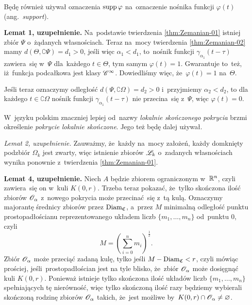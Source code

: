 \documentclass[a4paper,11pt]{article}
\numberwithin{equation}{section}
\begin{document}
Będę również używał oznaczenia $\operatorname{supp} \varphi$ na~oznaczenie nośnika
funkcji $\varphi( t )$ (ang.~\textit{support}).

\VerSpaceFour





\noindent
{} \textbf{Lemat 1, uzupełnienie.} Na~podstawie twierdzenia
\eqref{thm:Zemanian-01} istniej zbiór $\Psi$ o~żądanych własnościach. Teraz
na~mocy twierdzenia \eqref{thm:Zemanian-02} mamy
$d( \Theta, \complement \Psi ) = d_{ 1 } > 0$, jeśli więc $\alpha_{ 1 } < d_{ 1 }$, to~nośnik funkcji
$\gamma_{ \alpha_{ 1 } }( t - \tau )$ zawiera~się w~$\Psi$ dla~każdego $t \in \Theta$, tym samym
$\varphi( t ) = 1$. Gwarantuje to~też, iż~funkcja podcałkowa jest klasy
$\mathcal{C}^{ \infty }$. Dowiedliśmy więc, że~$\varphi( t ) = 1$ na~$\Theta$.

Jeśli teraz oznaczymy odległość $d( \Psi, \complement \Omega ) = d_{ 2 } > 0$ i~przyjmiemy
$\alpha_{ 2 } < d_{ 2 }$, to dla każdego $t \in \complement \Omega$ nośnik funkcji
$\gamma_{ \alpha_{ 1 } }( t - \tau )$ nie przecina~się z~$\Psi$, więc $\varphi( t ) = 0$.

\VerSpaceFour





\noindent
{} W~języku polskim znaczniej lepiej od~nazwy
\textit{lokalnie skończonego pokrycia} brzmi określenie \textit{pokrycie
  lokalnie skończone}. Jego też będę dalej używał.

\VerSpaceFour





\noindent
{} \textit{Lemat 2, uzupełnienie.} Zauważmy, że~każdy na~mocy
założeń, każdy domknięty podzbiór $\Omega_{ k }$ jest zwarty, więc
istnienie zbiorów $\mathcal{L}_{ k }$ o~zadanych własnościach wynika ponownie
z~twierdzenia \eqref{thm:Zemanian-01}.

\VerSpaceFour





\noindent
{} \textbf{Lemat 4, uzupełnienie.} Niech $A$ będzie zbiorem
ograniczonym w~$\mathbb{R}^{ n }$, czyli zawiera~się on w~kuli $K( 0, r )$. Trzeba
teraz pokazać, że~tylko skończona ilość zbiorów $\mathcal{O}_{ \alpha }$ z~nowego
pokrycia może przecinać~się z~tą kulą. Oznaczymy majorantę średnicy
zbiorów przez $\operatorname{Diam}_{ \mathfrak{C} }$, a~przez $M$ minimalną
odległość punktu prostopadłościanu reprezentowanego układem liczb
$\{ m_{ 1 }, \ldots, m_{ n } \}$ od~punktu $0$, czyli
\begin{equation}
  \label{eq:Zemanian-06}
  M = \left( \sum_{ i = 0 }^{ n } m_{ i } \right)^{ \frac{ 1 }{ 2 } }.
\end{equation}
Zbiór $\mathcal{O}_{ \alpha }$ może przeciąć zadaną kulę, tylko jeśli
$M - \operatorname{Diam}_{ \mathfrak{C} } < r$, czyli mówiąc prościej,
jeśli~prostopadłościan jest na tyle blisko, że~zbiór $\mathcal{O}_{ \alpha }$
może dosięgnąć kuli $K( 0, r )$. Ponieważ istnieje tylko skończona
ilość układów liczb $\{ m_{ 1 }, \ldots, m_{ n } \}$ spełniających tę
nierówność, więc tylko skończoną ilość razy będziemy wybierali
skończoną rodzinę zbiorów $\mathcal{O}_{ \alpha }$ takich, że~jest możliwe
by~$K( 0, r ) \cap \mathcal{O}_{ \alpha } \neq \varnothing$.
\end{document}
